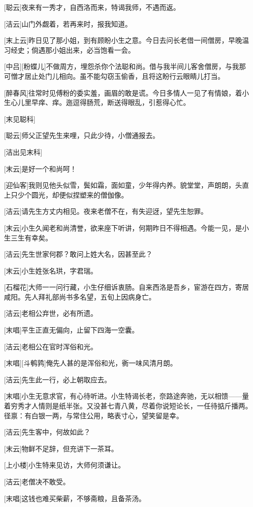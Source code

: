\documentclass{book}
\begin{document}
[聪云]夜来有一秀才，自西洛而来，特谒我师，不遇而返。

[洁云]山门外觑着，若再来时，报我知道。

[末上云]昨日见了那小姐，到有顾盼小生之意。今日去问长老借一间僧房，早晚温习经史；倘遇那小姐出来，必当饱看一会。

[中吕][粉蝶儿]不做周方，埋怨杀你个法聪和尚。借与我半间儿客舍僧房，与我那可憎才居止处门儿相向。虽不能勾窃玉偷香，且将这盼行云眼睛儿打当。

[醉春风]往常时见傅粉的委实羞，画眉的敢是谎。今日多情人一见了有情娘，着小生心儿里早痒、痒。迤逗得肠荒，断送得眼乱，引惹得心忙。

[末见聪科]

[聪云]师父正望先生来哩，只此少待，小僧通报去。

[洁出见末科]

[末云]是好一个和尚呵！

[迎仙客]我则见他头似雪，鬓如霜，面如童，少年得内养。貌堂堂，声朗朗，头直上只少个圆光，却便似捏塑来的僧伽像。

[洁云]请先生方丈内相见。夜来老僧不在，有失迎迓，望先生恕罪。

[末云]小生久闻老和尚清誉，欲来座下听讲，何期昨日不得相遇。今能一见，是小生三生有幸矣。

[洁云]先生世家何郡？敢问上姓大名，因甚至此？

[末云]小生姓张名珙，字君瑞。

[石榴花]大师一一问行藏，小生仔细诉衷肠。自来西洛是吾乡，宦游在四方，寄居咸阳。先人拜礼部尚书多名望，五旬上因病身亡。

[洁云]老相公弃世，必有所遗。

[末唱]平生正直无偏向，止留下四海一空囊。

[洁云]老相公在官时浑俗和光。

[末唱][斗鹌鹑]俺先人甚的是浑俗和光，衠一味风清月朗。

[洁云]先生此一行，必上朝取应去。

[末唱]小生无意求官，有心待听进。小生特谒长老，奈路途奔驰，无以相馈——量着穷秀才人情则是纸半张。又没甚七青八黄，尽着你说短论长，一任待掂斤播两。径禀：有白银一两，与常住公用，略表寸心，望笑留是幸。

[洁云]先生客中，何故如此？

[末云]物鲜不足辞，但充讲下一茶耳。

[上小楼]小生特来见访，大师何须谦让。

[洁云]老僧决不敢受。

[末唱]这钱也难买柴薪，不够斋粮，且备茶汤。
\end{document}
